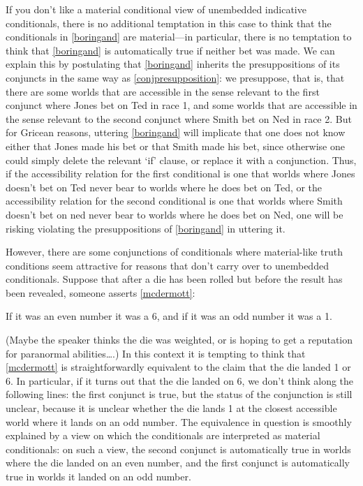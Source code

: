 \documentclass[If.tex]{subfiles}
\begin{document}
\begin{prop}
If you don't like a material conditional view of unembedded indicative conditionals, there is no additional temptation in this case to think that the conditionals in \ref{boringand} are material---in particular, there is no temptation to think that \ref{boringand} is automatically true if neither bet was made.  We can explain this by postulating that \ref{boringand} inherits the presuppositions of its conjuncts in the same way as \ref{conjpresupposition}: we presuppose, that is, that there are some worlds that are accessible in the sense relevant to the first conjunct where Jones bet on Ted in race 1, and some worlds that are accessible in the sense relevant to the second conjunct where Smith bet on Ned in race 2.  But for Gricean reasons, uttering \ref{boringand} will implicate that one does not know either that Jones made his bet or that Smith made his bet, since otherwise one could simply delete the relevant ‘if’ clause, or replace it with a conjunction.  Thus, if the accessibility relation for the first conditional is one that worlds where Jones doesn't bet on Ted never bear to worlds where he does bet on Ted, or the  accessibility relation for the second conditional is one that worlds where Smith doesn't bet on ned never bear to worlds where he does bet on Ned, one will be risking violating the presuppositions of \ref{boringand} in uttering it.  

However, there are some conjunctions of conditionals where material-like truth conditions seem attractive for reasons that don't carry over to unembedded conditionals.  Suppose that after a die has been rolled but before the result has been revealed, someone asserts \ref{mcdermott}:
\begin{prop}
	\nitem \label{mcdermott}
	If it was an even number it was a 6, and if it was an odd number it was a 1.
\end{prop}
(Maybe the speaker thinks the die was weighted, or is hoping to get a reputation for  paranormal abilities….)  In this context it is tempting to think that \ref{mcdermott} is straightforwardly equivalent to the claim that the die landed 1 or 6.  In particular, if it turns out that the die landed on 6, we don't think along the following lines: the first conjunct is true, but the status of the conjunction is still unclear, because it is unclear whether the die lands 1 at the closest accessible world where it lands on an odd number.  The equivalence in question is smoothly explained by a view on which the conditionals are interpreted as material conditionals: on such a view, the second conjunct is automatically true in worlds where the die landed on an even number, and the first conjunct is automatically true in worlds it landed on an odd number.  


\end{prop}
\end{document}
